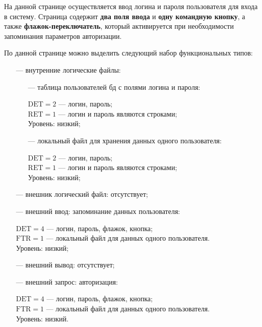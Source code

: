 На данной странице осуществляется ввод логина и пароля пользователя для входа в систему.
Страница содержит \textbf{два поля ввода} и \textbf{одну командную кнопку}, а также \textbf{флажок-переключатель}, который активируется при необходимости запоминания параметров авторизации.

По данной странице можно выделить следующий набор функциональных типов:

\begin{itemize}
    \item[---] внутренние логические файлы:
        \begin{itemize}
            \item[---] таблица пользователей бд с полями логина и пароля:

            $\text{DET} = 2$ --- логин, пароль;\\
            $\text{RET} = 1$ --- логин и пароль являются строками;\\
            Уровень:  низкий;
            
            \item[---] локальный файл для хранения данных одного пользователя:

            $\text{DET} = 2$ --- логин, пароль;\\
            $\text{RET} = 1$ --- логин и пароль являются строками;\\
            Уровень:  низкий;
            
        \end{itemize}
    \item[---] внешник логический файл: отсутствует;
    \item[---] внешний ввод: запоминание данных пользователя:
    
        $\text{DET} = 4$ --- логин, пароль, флажок, кнопка;\\
        $\text{FTR} = 1$ --- локальный файл для данных одного пользователя.\\
        Уровень: низкий;

    \item[---] внешний вывод: отсутствует;
    \item[---] внешний запрос: авторизация:

        $\text{DET} = 4$ --- логин, пароль, флажок, кнопка;\\
        $\text{FTR} = 1$ --- локальный файл для данных одного пользователя.\\
        Уровень: низкий.
\end{itemize}

